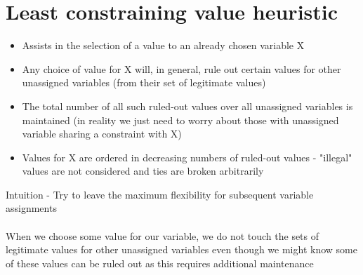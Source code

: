 \documentclass{article}[18pt]
\begin{document}
\section{Least constraining value heuristic}
\begin{defin}
\begin{itemize}
	\item Assists in the selection of a value to an already chosen variable X
	\item Any choice of value for X will, in general, rule out certain values for other unassigned variables (from their set of legitimate values)
	\item The total number of all such ruled-out values over all unassigned variables is maintained (in reality we just need to worry about those with unassigned variable sharing a constraint with X)
	\item Values for X are ordered in decreasing numbers of ruled-out values - "illegal" values are not considered and ties are broken arbitrarily 
\end{itemize}
\end{defin}
Intuition - Try to leave the maximum flexibility for subsequent variable assignments\\
\\
When we choose some value for our variable, we do not touch the sets of legitimate values for other unassigned variables even though we might know some of these values can be ruled out as this requires additional maintenance 
\end{document}
